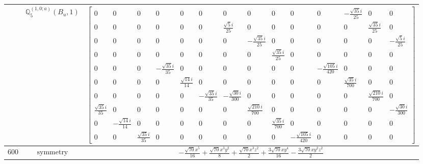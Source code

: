 \documentclass[fleqn,8pt,landscape]{jsarticle}
\begin{document}
\begin{longtable}{ccc}
$  $ & $ \mathbb{Q}_{5}^{(1,0;a)}(B_{u},1) $ & $ \begin{bmatrix} 0 & 0 & 0 & 0 & 0 & 0 & 0 & 0 & 0 & 0 & 0 & - \frac{\sqrt{35} i}{25} & 0 & 0 \\ 0 & 0 & 0 & 0 & 0 & 0 & \frac{\sqrt{5} i}{25} & 0 & 0 & 0 & 0 & 0 & \frac{\sqrt{35} i}{25} & 0 \\ 0 & 0 & 0 & 0 & 0 & 0 & 0 & - \frac{\sqrt{35} i}{25} & 0 & 0 & 0 & 0 & 0 & - \frac{\sqrt{5} i}{25} \\ 0 & 0 & 0 & 0 & 0 & 0 & 0 & 0 & \frac{\sqrt{35} i}{25} & 0 & 0 & 0 & 0 & 0 \\ 0 & 0 & 0 & - \frac{\sqrt{35} i}{35} & 0 & 0 & 0 & 0 & 0 & 0 & - \frac{\sqrt{105} i}{420} & 0 & 0 & 0 \\ 0 & 0 & 0 & 0 & \frac{\sqrt{14} i}{14} & 0 & 0 & 0 & 0 & 0 & 0 & \frac{\sqrt{35} i}{700} & 0 & 0 \\ 0 & 0 & 0 & 0 & 0 & - \frac{\sqrt{35} i}{35} & - \frac{\sqrt{30} i}{300} & 0 & 0 & 0 & 0 & 0 & \frac{\sqrt{210} i}{700} & 0 \\ \frac{\sqrt{35} i}{35} & 0 & 0 & 0 & 0 & 0 & 0 & \frac{\sqrt{210} i}{700} & 0 & 0 & 0 & 0 & 0 & - \frac{\sqrt{30} i}{300} \\ 0 & - \frac{\sqrt{14} i}{14} & 0 & 0 & 0 & 0 & 0 & 0 & \frac{\sqrt{35} i}{700} & 0 & 0 & 0 & 0 & 0 \\ 0 & 0 & \frac{\sqrt{35} i}{35} & 0 & 0 & 0 & 0 & 0 & 0 & - \frac{\sqrt{105} i}{420} & 0 & 0 & 0 & 0 \end{bmatrix} $ \\ \hline
$ 600 $ & $ \text{symmetry} $ & $ - \frac{\sqrt{70} x^{5}}{16} + \frac{\sqrt{70} x^{3} y^{2}}{8} + \frac{\sqrt{70} x^{3} z^{2}}{2} + \frac{3 \sqrt{70} x y^{4}}{16} - \frac{3 \sqrt{70} x y^{2} z^{2}}{2} $ \\

\end{longtable}
\end{document}
